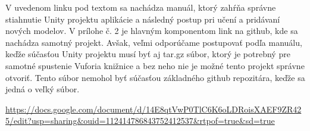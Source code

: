 V uvedenom linku pod textom sa nachádza manuál, ktorý zahŕňa správne stiahnutie Unity projektu aplikácie a následný postup pri učení a pridávaní nových modelov. V prílohe č. 2 je hlavným komponentom link na github, kde sa nachádza samotný projekt. Avšak, veľmi odporúčame postupovať podľa manuálu, keďže súčasťou Unity projektu musí byť aj tar.gz súbor, ktorý je potrebný pre samotné spustenie Vuforia knižnice a bez neho nie je možné tento projekt správne otvoriť. Tento súbor nemohol byť súčasťou základného github repozitára, keďže sa jedná o veľký súbor.

\url{https://docs.google.com/document/d/14E8qtVwP0TlC6K6oLDRoisXAEF9ZR425/edit?usp=sharing&ouid=112414786843752412537&rtpof=true&sd=true}
